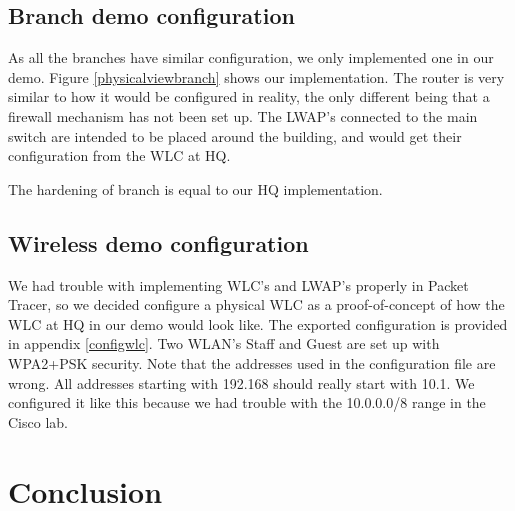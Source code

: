 \subsection{Branch demo configuration}


As all the branches have similar configuration, we only implemented one in our demo. Figure \ref{physicalviewbranch} shows our implementation. %
The router is very similar to how it would be configured in reality, the only different being that a firewall mechanism has not been set up. The LWAP's connected to the main switch are intended to be placed around the building, and would get their configuration from the WLC at HQ.

The hardening of branch is equal to our HQ implementation.

\subsection{Wireless demo configuration} \label{demowireless}

We had trouble with implementing WLC's and LWAP's properly in Packet Tracer, so we decided configure a physical WLC as a proof-of-concept of how the WLC at HQ in our demo would look like. The exported configuration is provided in appendix \ref{configwlc}. Two WLAN's Staff and Guest are set up with WPA2+PSK security. Note that the addresses used in the configuration file are wrong. All addresses starting with 192.168 should really start with 10.1. We configured it like this because we had trouble with the 10.0.0.0/8 range in the Cisco lab.

\section{Conclusion}





